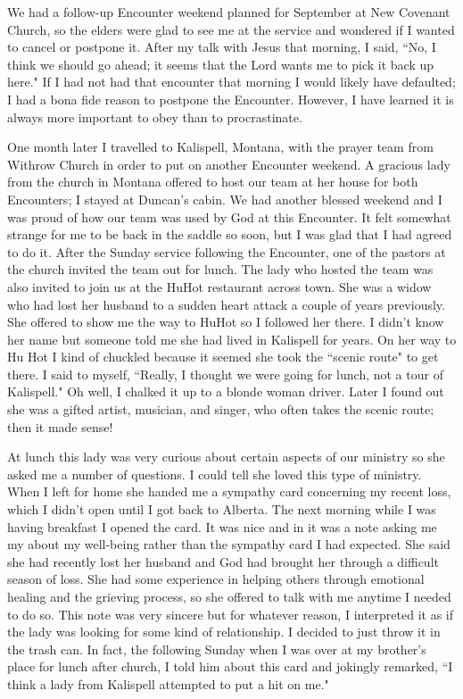 \documentclass[oneside,12pt]{book}
\begin{document}
We had a follow-up Encounter weekend planned for September at New Covenant Church, so the elders were glad to see me at the service and wondered if I wanted to cancel or postpone it. After my talk with Jesus that morning, I said, ``No, I think we should go ahead; it seems that the Lord wants me to pick it back up here." If I had not had that encounter that morning I would likely have defaulted; I had a bona fide reason to postpone the Encounter. However, I have learned it is always more important to obey than to procrastinate. 

One month later I travelled to Kalispell, Montana, with the prayer team from Withrow Church in order to put on another Encounter weekend. A gracious lady from the church in Montana offered to host our team at her house for both Encounters; I stayed at Duncan's cabin. We had another blessed weekend and I was proud of how our team was used by God at this Encounter. It felt somewhat strange for me to be back in the saddle so soon, but I was glad that I had agreed to do it. After the Sunday service following the Encounter, one of the pastors at the church invited the team out for lunch. The lady who hosted the team was also invited to join us at the HuHot restaurant across town. She was a widow who had lost her husband to a sudden heart attack a couple of years previously. She offered to show me the way to HuHot so I followed her there. I didn't know her name but someone told me she had lived in Kalispell for years. On her way to Hu Hot I kind of chuckled because it seemed she took the ``scenic route" to get there. I said to myself, ``Really, I thought we were going for lunch, not a tour of Kalispell." Oh well, I chalked it up to a blonde woman driver. Later I found out she was a gifted artist, musician, and singer, who often takes the scenic route; then it made sense! 

At lunch this lady was very curious about certain aspects of our ministry so she asked me a number of questions. I could tell she loved this type of ministry. When I left for home she handed me a sympathy card concerning my recent loss, which I didn't open until I got back to Alberta. The next morning while I was having breakfast I opened the card. It was nice and in it was a note asking me my about my well-being rather than the sympathy card I had expected. She said she had recently lost her husband and God had brought her through a difficult season of loss. She had some experience in helping others through emotional healing and the grieving process, so she offered to talk with me anytime I needed to do so. This note was very sincere but for whatever reason, I interpreted it as if the lady was looking for some kind of relationship. I decided to just throw it in the trash can. In fact, the following Sunday when I was over at my brother's place for lunch after church, I told him about this card and jokingly remarked, ``I think a lady from Kalispell attempted to put a hit on me." 
\end{document}
